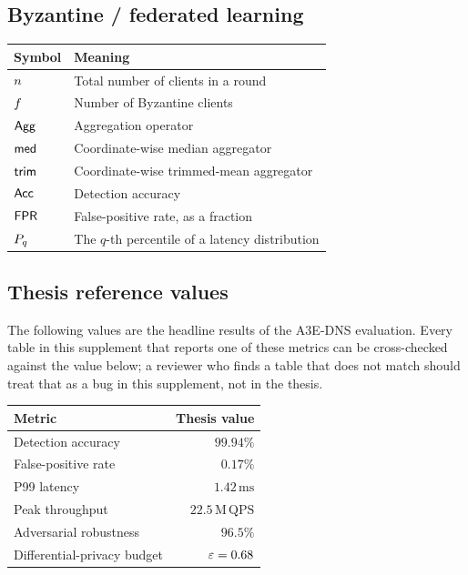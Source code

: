 \subsection*{Byzantine / federated learning}

\begin{center}
\begin{tabular}{ll}
\toprule
Symbol & Meaning \\
\midrule
$n$      & Total number of clients in a round \\
$f$    & Number of Byzantine clients \\
$\mathsf{Agg}$           & Aggregation operator \\
$\mathsf{med}$           & Coordinate-wise median aggregator \\
$\mathsf{trim}$          & Coordinate-wise trimmed-mean aggregator \\
$\mathsf{Acc}$           & Detection accuracy \\
$\mathsf{FPR}$           & False-positive rate, as a fraction \\
$P_{q}$        & The $q$-th percentile of a latency distribution \\
\bottomrule
\end{tabular}
\end{center}

\subsection*{Thesis reference values}

The following values are the headline results of the A3E-DNS
evaluation. Every table in this supplement that reports one of these
metrics can be cross-checked against the value below; a reviewer
who finds a table that does not match should treat that as a bug in
this supplement, not in the thesis.

\begin{center}
\begin{tabular}{lr}
\toprule
Metric & Thesis value \\
\midrule
Detection accuracy              & $99.94\%$ \\
False-positive rate             & $0.17\%$ \\
P99 latency                     & $1.42\,\mathrm{ms}$ \\
Peak throughput                 & $22.5\,\mathrm{M}\,\mathrm{QPS}$ \\
Adversarial robustness          & $96.5\%$ \\
Differential-privacy budget     & $\varepsilon = 0.68$ \\
\bottomrule
\end{tabular}
\end{center}
